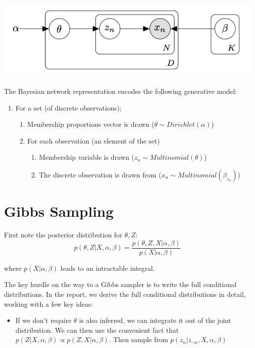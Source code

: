 \documentclass[a0,portrait]{a0poster}
\begin{document}
\begin{multicols}{2}
\vspace{2cm}
\begin{minipage}{\linewidth}%
	\centering%
	\includegraphics[width=.8\linewidth]{pgm}%
	\label{fig:pgm}
\end{minipage}%

\large{
The Bayesian network representation encodes the following generative model:
	\begin{enumerate}
		\item For a set (of discrete observations);
		\begin{enumerate}
			\item Membership proportions vector is drawn ($\theta \sim Dirichlet(\alpha)$)
			\item For each observation (an element of the set)
			\begin{enumerate}
				\item Membership variable is drawn ($z_n \sim Multinomial(\theta)$)
				\item The discrete observation is drawn from ($x_n \sim Multinomial(\beta_{z_n})$)
			\end{enumerate}
		\end{enumerate}
	\end{enumerate}
}


\section{Gibbs Sampling}

\large{
	First note the posterior distribution for $\theta, Z$:
	$$	
	p(\theta, Z | X, \alpha, \beta) = \dfrac{p(\theta, Z, X | \alpha, \beta)}{p(X | \alpha, \beta)}
	$$
	
	where $p(X | \alpha, \beta)$ leads to an intractable integral. 
	
	The key hurdle on the way to a Gibbs sampler is to write the full conditional distributions. In the report, we derive the full conditional distributions in detail, working with a few key ideas:
	
	\begin{itemize}
		\item If we don't require $\theta$ is also inferred, we can integrate it out of the joint distribution. We can then use the convenient fact that $p(Z|X,\alpha, \beta) \propto p(Z, X|\alpha, \beta)$. Then sample from $p(z_n | z_{\neg n},X, \alpha, \beta)$
		

\end{itemize}}
\end{multicols}
\end{document}
